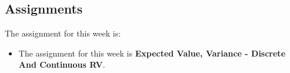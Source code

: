 \subsection{Assignments}

The assignment for this week is:

\begin{itemize}
    \item The assignment for this week is \textbf{Expected Value, Variance - Discrete And Continuous RV}. 
\end{itemize}